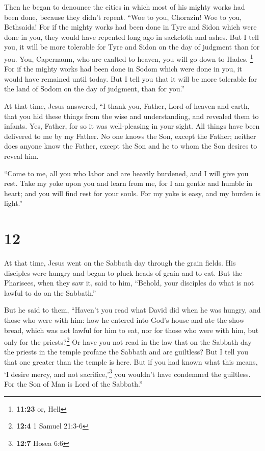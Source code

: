 Then he began to denounce the cities in which most of
his mighty works had been done, because they didn't repent.
 ``Woe to you, Chorazin! Woe to you, Bethsaida! For if
the mighty works had been done in Tyre and Sidon which were done in you,
they would have repented long ago in sackcloth and ashes.
 But I tell you, it will be more tolerable for Tyre and
Sidon on the day of judgment than for you.  You,
Capernaum, who are exalted to heaven, you will go down to Hades.
\footnote{\textbf{11:23} or, Hell} For if the mighty works had been done
in Sodom which were done in you, it would have remained until today.
 But I tell you that it will be more tolerable for the
land of Sodom on the day of judgment, than for you.''

 At that time, Jesus answered, ``I thank you, Father,
Lord of heaven and earth, that you hid these things from the wise and
understanding, and revealed them to infants.  Yes,
Father, for so it was well-pleasing in your sight.  All
things have been delivered to me by my Father. No one knows the Son,
except the Father; neither does anyone know the Father, except the Son
and he to whom the Son desires to reveal him.

 ``Come to me, all you who labor and are heavily
burdened, and I will give you rest.  Take my yoke upon
you and learn from me, for I am gentle and humble in heart; and you will
find rest for your souls.  For my yoke is easy, and my
burden is light.''

\hypertarget{section-11}{%
\section{12}\label{section-11}}

 At that time, Jesus went on the Sabbath day through the
grain fields. His disciples were hungry and began to pluck heads of
grain and to eat.  But the Pharisees, when they saw it,
said to him, ``Behold, your disciples do what is not lawful to do on the
Sabbath.''

 But he said to them, ``Haven't you read what David did
when he was hungry, and those who were with him:  how he
entered into God's house and ate the show bread, which was not lawful
for him to eat, nor for those who were with him, but only for the
priests?\footnote{\textbf{12:4} 1 Samuel 21:3-6}  Or have
you not read in the law that on the Sabbath day the priests in the
temple profane the Sabbath and are guiltless?  But I tell
you that one greater than the temple is here.  But if you
had known what this means, `I desire mercy, and not
sacrifice,'\footnote{\textbf{12:7} Hosea 6:6} you wouldn't have
condemned the guiltless.  For the Son of Man is Lord of
the Sabbath.''

